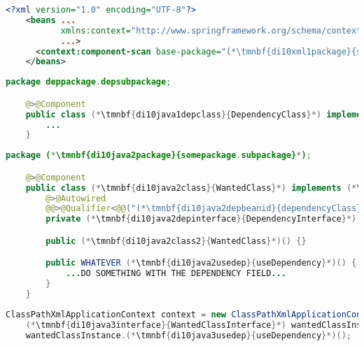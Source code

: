 \begin{lstlisting}[language=XML, title={Configuration XML}]
    <?xml version="1.0" encoding="UTF-8"?>
    <beans ...
           xmlns:context="http://www.springframework.org/schema/context"
           ...>
      <context:component-scan base-package="(*\tmnbf{di10xml1package}{somepackage.subpackage}[ForestGreen]*)"/>
    </beans>
\end{lstlisting}
\begin{lstlisting}[language=Java, title={Dependency class}]
    package deppackage.depsubpackage;

    @>@Component
    public class (*\tmnbf{di10java1depclass}{DependencyClass}*) implements (*\tmnbf{di10java1depinterface}{DependencyInterface}*) {
        ...
    }
\end{lstlisting}
\begin{lstlisting}[language=Java, title={Wanted class with the zero--parameter constructor}]
    package (*\tmnbf{di10java2package}{somepackage.subpackage}*);

    @>@Component
    public class (*\tmnbf{di10java2class}{WantedClass}*) implements (*\tmnbf{di10java2interface}{WantedClassInterface}*) {
        @>@Autowired
        @@>@Qualifier<@@("(*\tmnbf{di10java2depbeanid}{dependencyClass}[ForestGreen]*)")
        private (*\tmnbf{di10java2depinterface}{DependencyInterface}*) dependencyField;

        public (*\tmnbf{di10java2class2}{WantedClass}*)() {}

        public WHATEVER (*\tmnbf{di10java2usedep}{useDependency}*)() {
            ...DO SOMETHING WITH THE DEPENDENCY FIELD...
        }
    }
\end{lstlisting}
\begin{lstlisting}[language=Java, title={Usage}]
    ClassPathXmlApplicationContext context = new ClassPathXmlApplicationContext("configurationFile.xml");
    (*\tmnbf{di10java3interface}{WantedClassInterface}*) wantedClassInstance = context.getBean("(*\tmnbf{di10java3beanid}{wantedClass}[ForestGreen]*)", (*\tmnbf{di10java3interface2}{WantedClassInterface}*).class);
    wantedClassInstance.(*\tmnbf{di10java3usedep}{useDependency}*)();
\end{lstlisting}
\newpage

